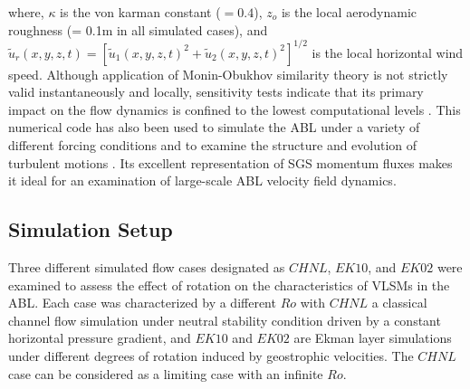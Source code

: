 \documentclass{amsart}
\begin{document}
\noindent where, $\kappa$ is the von karman constant ($=0.4$), $z_o$ is the local aerodynamic roughness (= 0.1m in all simulated cases), and $\tilde{u}_r(x,y,z,t)=[\tilde{u}_1(x,y,z,t)^{2}+\tilde{u}_2(x,y,z,t)^{2}]^{1/2}$ is the local horizontal wind speed. Although application of Monin-Obukhov similarity theory is not strictly valid instantaneously and locally, sensitivity tests indicate that its primary impact on the flow dynamics is confined to the lowest computational levels \citep{stoll_blm_2006}. This numerical code has also been used to simulate the ABL under a variety of different forcing conditions \citep[e.g.,][]{stoll_jas_2009,bailey_blm_2013,miller_blm_2013} and to examine the structure and evolution of turbulent motions \citep[e.g.,][]{bailey_ae_2014,bailey_jfm_2016}.  Its excellent representation of SGS momentum fluxes \citep{stoll_wrr_2006} makes it ideal for an examination of large-scale ABL velocity field dynamics.


\subsection{Simulation Setup}
Three different simulated flow cases designated as $CHNL$, $EK10$, and $EK02$ were examined to assess the effect of rotation on the characteristics of VLSMs in the ABL. Each case was characterized by a different $Ro$ with $CHNL$ a classical channel flow simulation under neutral stability condition driven by a constant horizontal pressure  gradient, and $EK10$ and $EK02$ are Ekman layer simulations under different degrees of rotation induced by geostrophic velocities. The $CHNL$ case can be considered as a limiting case with an infinite $Ro$. 
\end{document}
